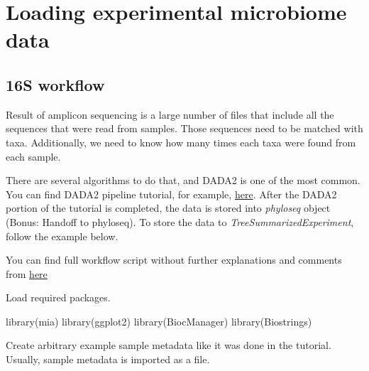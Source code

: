 \documentclass[
]{book}
\newenvironment{Shaded}{\begin{snugshade}}{\end{snugshade}}
\newcommand{\FunctionTok}[1]{\textcolor[rgb]{0.00,0.00,0.00}{#1}}
\newcommand{\NormalTok}[1]{#1}
\begin{document}
\hypertarget{loading-experimental-microbiome-data}{%
\section{Loading experimental microbiome data}\label{loading-experimental-microbiome-data}}

\hypertarget{s-workflow}{%
\subsection{16S workflow}\label{s-workflow}}

Result of amplicon sequencing is a large number of files that include all the sequences
that were read from samples. Those sequences need to be matched with taxa. Additionally,
we need to know how many times each taxa were found from each sample.

There are several algorithms to do that, and DADA2 is one of the most common.
You can find DADA2 pipeline tutorial, for example,
\href{https://benjjneb.github.io/dada2/tutorial.html}{here}.
After the DADA2 portion of the tutorial is completed, the data is stored into \emph{phyloseq} object
(Bonus: Handoff to phyloseq). To store the data to \emph{TreeSummarizedExperiment},
follow the example below.

You can find full workflow script without further explanations and comments from
\href{https://github.com/microbiome/OMA/blob/master/dada2_workflow.Rmd}{here}

Load required packages.

\begin{Shaded}
\begin{Highlighting}[]
\FunctionTok{library}\NormalTok{(mia)}
\FunctionTok{library}\NormalTok{(ggplot2)}
\FunctionTok{library}\NormalTok{(BiocManager)}
\FunctionTok{library}\NormalTok{(Biostrings)}
\end{Highlighting}
\end{Shaded}

Create arbitrary example sample metadata like it was done in the tutorial. Usually,
sample metadata is imported as a file.
\end{document}
